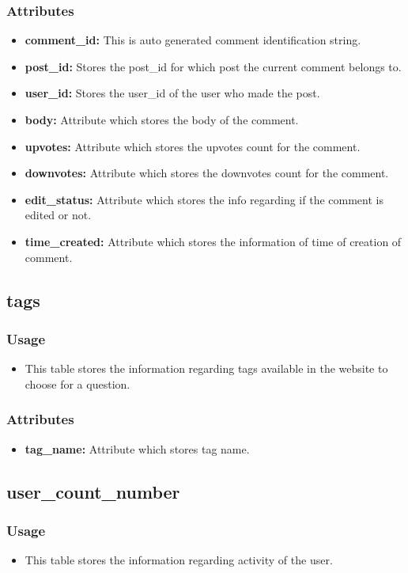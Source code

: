 \documentclass[12pt,a4paper]{article}
\begin{document}
\subsubsection{Attributes}
\begin{itemize}
	\item \textbf{comment\_id: }This is auto generated comment identification string.
	\item \textbf{post\_id: }Stores the post\_id for which post the current comment belongs to.
	\item \textbf{user\_id: }Stores the user\_id of the user who made the post.
	\item \textbf{body:} Attribute which stores the body of the comment.
	\item \textbf{upvotes: }Attribute which stores the upvotes count for the comment.
	\item \textbf{downvotes: }Attribute which stores the downvotes count for the comment.
	\item \textbf{edit\_status: }Attribute which stores the info regarding if the comment is edited or not.
	\item \textbf{time\_created: }Attribute which stores the information of time of creation of comment.
\end{itemize}
	\subsection{tags}
		\subsubsection{Usage}
\begin{itemize}
	\item This table stores the information regarding tags available in the website to choose for a question. 
\end{itemize}
\subsubsection{Attributes}
\begin{itemize}
	\item \textbf{tag\_name: }Attribute which stores tag name.
\end{itemize}

	\subsection{user\_count\_number}
		\subsubsection{Usage}
\begin{itemize}
	\item This table stores the information regarding activity of the user.
\end{itemize}
\end{document}
